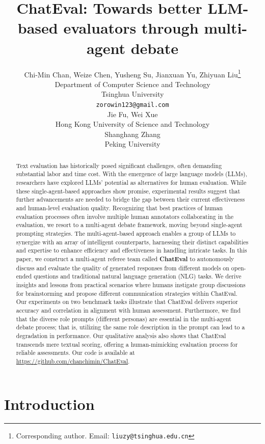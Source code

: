 \documentclass{article} %
\title{ChatEval: Towards better LLM-based evaluators through multi-agent debate}
\author{Chi-Min Chan, Weize Chen, Yusheng Su, Jianxuan Yu, Zhiyuan Liu\thanks{Corresponding author. Email: \texttt{liuzy@tsinghua.edu.cn}} \\
Department of Computer Science and Technology\\
Tsinghua University\\
\texttt{zorowin123@gmail.com} \\
\And
Jie Fu, Wei Xue \\
Hong Kong University of Science and Technology \\
\And
Shanghang Zhang \\
Peking University \\
}
\begin{document}
\maketitle

\begin{abstract}
Text evaluation has historically posed significant challenges, often demanding substantial labor and time cost. With the emergence of large language models (LLMs), researchers have explored LLMs' potential as alternatives for human evaluation. While these single-agent-based approaches show promise, experimental results suggest that further advancements are needed to bridge the gap between their current effectiveness and human-level evaluation quality. 
Recognizing that best practices of human evaluation processes often involve multiple human annotators collaborating in the evaluation, we resort to a multi-agent debate framework, moving beyond single-agent prompting strategies.
The multi-agent-based approach enables a group of LLMs to synergize with an array of intelligent counterparts, harnessing their distinct capabilities and expertise to enhance efficiency and effectiveness in handling intricate tasks. In this paper, we construct a multi-agent referee team called \textbf{ChatEval} to autonomously discuss and evaluate the quality of generated responses from different models on open-ended questions and traditional natural language generation (NLG) tasks. We derive insights and lessons from practical scenarios where humans instigate group discussions for brainstorming and propose different communication strategies within ChatEval. Our experiments on two benchmark tasks illustrate that ChatEval delivers superior accuracy and correlation in alignment with human assessment. Furthermore, we find that the diverse role prompts (different personas) are essential in the multi-agent debate process; that is, utilizing the same role description in the prompt can lead to a degradation in performance. Our qualitative analysis also shows that ChatEval transcends mere textual scoring, offering a human-mimicking evaluation process for reliable assessments.
Our code is available at \url{https://github.com/chanchimin/ChatEval}. 



\end{abstract}


\section{Introduction}
\label{sec:introduction}

\end{document}
